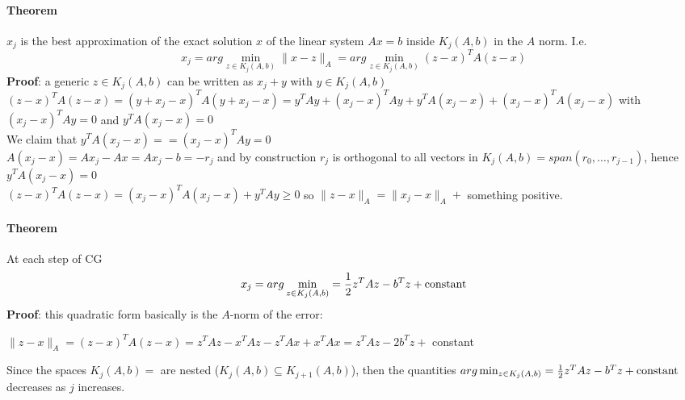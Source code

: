 \documentclass[10pt]{report}
\begin{document}
\paragraph{Theorem} $x_j$ is the best approximation of the exact solution $x$ of the linear system $Ax = b$ inside $K_j(A,b)$ in the $A$ norm. I.e.
$$x_j = arg\min_{z\in K_j(A,b)} \|x-z\|_A = arg\min_{z\in K_j(A,b)} (z-x)^TA(z-x)$$
\textbf{Proof}: a generic $z\in K_j(A,b)$ can be written as $x_j+y$ with $y\in K_j(A,b)$\\
$(z-x)^TA(z-x) = (y+x_j-x)^TA(y+x_j-x) = y^TAy + (x_j-x)^TAy + y^TA(x_j-x) + (x_j-x)^TA(x_j-x)$ with $(x_j-x)^TAy = 0$ and $y^TA(x_j-x) = 0$\\
We claim that $y^TA(x_j-x)= = (x_j-x)^TAy = 0$\\
$A(x_j-x) = Ax_j - Ax = Ax_j - b = -r_j$ and by construction $r_j$ is orthogonal to all vectors in $K_j(A,b) = span (r_0,\ldots,r_{j-1})$, hence $y^TA(x_j-x)=0$\\
$(z-x)^TA(z-x) = (x_j-x)^TA(x_j-x) + y^TAy \geq 0$ so $\|z-x\|_A = \|x_j-x\|_A +$ something positive.
\paragraph{Theorem} At each step of CG $$x_j = arg\min_{z\in K_j(A,b)} = \frac{1}{2}z^TAz - b^Tz + \hbox{constant}$$
\textbf{Proof}: this quadratic form basically is the $A$-norm of the error:\begin{list}{}{}
	\item $\|z-x\|_A = (z-x)^TA(z-x) = z^TAz - x^TAz - z^TAx + x^TAx = z^TAz - 2b^Tz +$ constant
\end{list}
Since the spaces $K_j(A,b)=$ are nested ($K_j(A,b)\subseteq K_{j+1}(A,b)$), then the quantities $arg\min_{z\in K_j(A,b)} = \frac{1}{2}z^TAz - b^Tz + \hbox{constant}$ decreases as $j$ increases.
\end{document}
